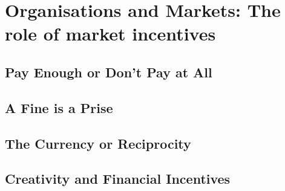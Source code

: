 
\chapter{Organisations and Markets: The role of market incentives}

\section{Pay Enough or Don't Pay at All}
\section{A Fine is a Prise}
\section{The Currency or Reciprocity}
\section{Creativity and Financial Incentives}

